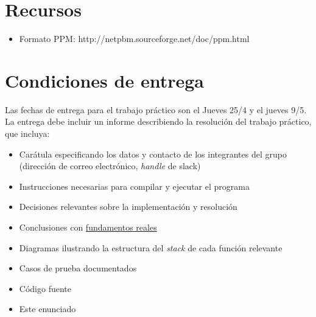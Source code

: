 \documentclass{article}
\begin{document}
\section{Recursos}

\begin{itemize}
\item Formato PPM: http://netpbm.sourceforge.net/doc/ppm.html
\end{itemize}

\section{Condiciones de entrega}

Las fechas de entrega para el trabajo práctico son el Jueves 25/4 y el jueves 9/5. La entrega debe incluir un informe
describiendo la resolución del trabajo práctico, que incluya:

\begin{itemize}
\item Carátula especificando los datos y contacto de los integrantes del grupo (dirección de correo electrónico, \textit{handle} de slack)
\item Instrucciones necesarias para compilar y ejecutar el programa
\item Decisiones relevantes sobre la implementación y resolución
\item Conclusiones con \underline{fundamentos reales}
\item Diagramas ilustrando la estructura del \textit{stack} de cada función relevante
\item Casos de prueba documentados
\item Código fuente
\item Este enunciado
\end{itemize}
\end{document}
